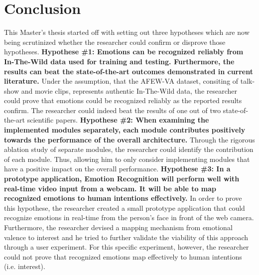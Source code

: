 
\chapter{Conclusion}
This Master's thesis started off with setting out three hypotheses which are now being scrutinized whether the researcher could confirm or disprove those hypotheses.\newline\newline
\textbf{Hypothese \#1: Emotions can be recognized reliably from In-The-Wild data used for training and testing. Furthermore, the results can beat the state-of-the-art outcomes demonstrated in current literature.}\newline
Under the assumption, that the AFEW-VA dataset, consiting of talk-show and movie clips, represents authentic In-The-Wild data, the researcher could prove that emotions could be recognized reliably as the reported results confirm. The researcher could indeed beat the results of one out of two state-of-the-art scientific papers.
\newline\newline
\textbf{Hypothese \#2: When examining the implemented modules separately, each module contributes positively towards the performance of the overall architecture.}\newline
Through the rigorous ablation study of separate modules, the researcher could identify the contribution of each module. Thus, allowing him to only consider implementing modules that have a positive impact on the overall performance.
\newline\newline
\textbf{Hypothese \#3: In a prototype application, Emotion Recognition will perform well with real-time video input from a webcam. It will be able to map recognized emotions to human intentions effectively.}\newline
In order to prove this hypothese, the researcher created a small prototype application that could recognize emotions in real-time from the person's face in front of the web camera. Furthermore, the researcher devised a mapping mechanism from emotional valence to interest and he tried to further validate the viability of this approach through a user experiment. For this specific experiment, however, the researcher could not prove that recognized emotions map effectively to human intentions (i.e. interest).


